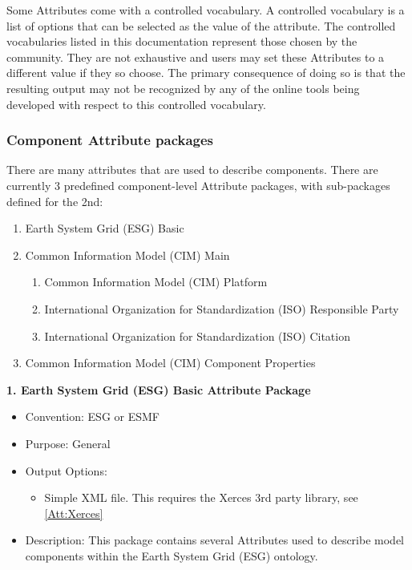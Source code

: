 Some Attributes come with a controlled vocabulary. A controlled vocabulary is a list of options that can be selected as the value of the attribute. The controlled vocabularies listed in this documentation represent those chosen by the community. They are not exhaustive and users may set these Attributes to a different value if they so choose. The primary consequence of doing so is that the resulting output may not be recognized by any of the online tools being developed with respect to this controlled vocabulary.  


\subsubsection{Component Attribute packages}
\label{ComponentAttributePackages}

There are many attributes that are used to describe components. There are currently 3 predefined component-level Attribute packages, with sub-packages defined for the 2nd:

\begin{enumerate}
    \item Earth System Grid (ESG) Basic
    \item Common Information Model (CIM) Main
    \begin{enumerate}
        \item Common Information Model (CIM) Platform
        \item International Organization for Standardization (ISO) Responsible Party
        \item International Organization for Standardization (ISO) Citation
    \end{enumerate}
    \item Common Information Model (CIM) Component Properties
\end{enumerate}

\vspace{.20in}

{\bf 1. Earth System Grid (ESG) Basic Attribute Package}

\begin{itemize}
    \item Convention: ESG or ESMF
    \item Purpose: General
    \item Output Options:
    \begin{itemize}
        \item{Simple XML file. This requires the Xerces 3rd party library, see \ref{Att:Xerces}}
    \end{itemize} 
    \item Description: This package contains several Attributes used to describe model components within the Earth System Grid (ESG) ontology. 
\end{itemize}


